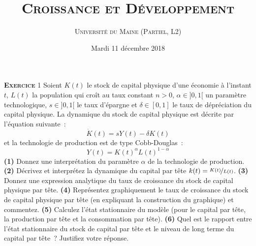 \documentclass[10pt,a4paper,notitlepage,twocolumn]{article}
\newcommand{\exercice}[1]{\textsc{\textbf{Exercice}} #1}
\newcommand{\question}[1]{\textbf{(#1)}}
\begin{document}
\title{\textsc{Croissance et Développement}}
\author{\textsc{Université du Maine (Partiel, L2)}}
\date{Mardi 11 décembre 2018}

\maketitle
\thispagestyle{empty}


\exercice{1} Soient $K(t)$ le stock de capital physique d'une économie
à l'instant $t$, $L(t)$ la population qui croît au taux constant
$n>0$, $\alpha\in]0,1[$ un paramètre technologique, $s\in]0,1[$ le
taux d'épargne et $\delta\in[0,1]$ le taux de dépréciation du capital
physique. La dynamique du stock de capital physique est décrite par
l'équation suivante :
\[
\dot K(t) = sY(t)-\delta K(t)
\]
et la technologie de production est de type Cobb-Douglas :
\[
Y(t) = K(t)^\alpha L(t)^{1-\alpha}
\]
\question{1} Donnez une interprétation du paramètre $\alpha$ de la
technologie de production. \question{2} Décrivez et interprétez la
dynamique du capital par tête
$k(t)=\nicefrac{K(t)}{L(t)}$. \question{3} Donnez une expression
analytique du taux de croissance du stock de capital physique par
tête. \question{4} Représentez graphiquement le taux de croissance du
stock de capital physique par tête (en expliquant la construction du
graphique) et commentez. \question{5} Calculez l'état stationnaire du
modèle (pour le capital par tête, la production par tête et la
consommation par tête). \question{6} Quel est le rapport entre l'état
stationnaire du stock de capital par tête et le niveau de long terme
du capital par tête ? Justifiez votre réponse.\newline
\end{document}
